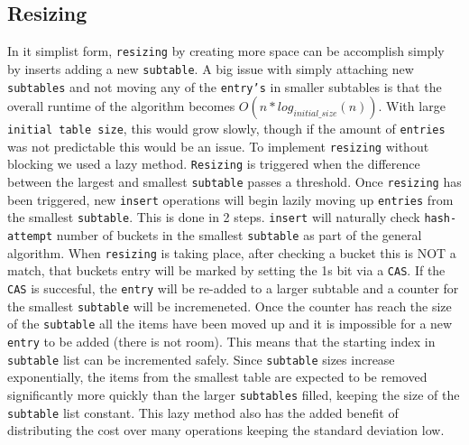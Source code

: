 \subsection{Resizing}
In it simplist form, \texttt{resizing} by creating more space can be
accomplish simply by inserts adding a new \texttt{subtable}. A big
issue with simply attaching new \texttt{subtables} and not moving any
of the \texttt{entry's} in smaller subtables is that the overall
runtime of the algorithm becomes $O(n*log_{initial\_size}(n))$. With
large \texttt{initial table size}, this would grow slowly, though if
the amount of \texttt{entries} was not predictable this would be an
issue. To implement \texttt{resizing} without blocking we used a lazy
method. \texttt{Resizing} is triggered when the difference between the
largest and smallest \texttt{subtable} passes a threshold. Once
\texttt{resizing} has been triggered, new \texttt{insert} operations
will begin lazily moving up \texttt{entries} from the smallest
\texttt{subtable}. This is done in 2 steps. \texttt{insert} will
naturally check \texttt{hash-attempt} number of buckets in the
smallest \texttt{subtable} as part of the general algorithm. When
\texttt{resizing} is taking place, after checking a bucket this is NOT
a match, that buckets entry will be marked by setting the 1s bit via a
\texttt{CAS}. If the \texttt{CAS} is succesful, the \texttt{entry}
will be re-added to a larger subtable and a counter for the smallest
\texttt{subtable} will be incremeneted. Once the counter has reach the
size of the \texttt{subtable} all the items have been moved up and it
is impossible for a new \texttt{entry} to be added (there is not
room). This means that the starting index in \texttt{subtable} list
can be incremented safely. Since \texttt{subtable} sizes increase
exponentially, the items from the smallest table are expected to be
removed significantly more quickly than the larger \texttt{subtables}
filled, keeping the size of the \texttt{subtable} list constant. This
lazy method also has the added benefit of distributing the cost over
many operations keeping the standard deviation low.

